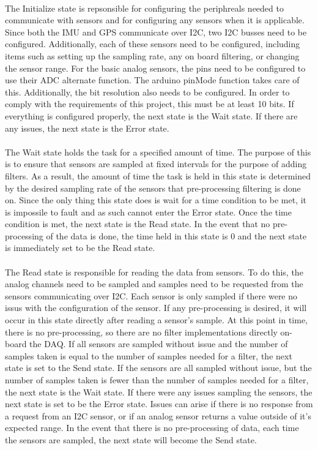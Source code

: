 \paragraph{}
The Initialize state is repsonsible for configuring the periphreals needed to communicate with sensors and for configuring any sensors when it is applicable.
Since both the IMU and GPS communicate over I2C, two I2C busses need to be configured.
Additionally, each of these sensors need to be configured, including items such as setting up the sampling rate, any on board filtering, or changing the sensor range.
For the basic analog sensors, the pins need to be configured to use their ADC alternate function.
The arduino pinMode function takes care of this.
Additionally, the bit resolution also needs to be configured.
In order to comply with the requirements of this project, this must be at least 10 bits.
If everything is configured properly, the next state is the Wait state.
If there are any issues, the next state is the Error state.

\paragraph{}
The Wait state holds the task for a specified amount of time.
The purpose of this is to ensure that sensors are sampled at fixed intervals for the purpose of adding filters.
As a result, the amount of time the task is held in this state is determined by the desired sampling rate of the sensors that pre-processing filtering is done on.
Since the only thing this state does is wait for a time condition to be met, it is impossile to fault and as such cannot enter the Error state.
Once the time condition is met, the next state is the Read state.
In the event that no pre-processing of the data is done, the time held in this state is 0 and the next state is immediately set to be the Read state.

\paragraph{}
The Read state is responsible for reading the data from sensors.
To do this, the analog channels need to be sampled and samples need to be requested from the sensors communicating over I2C.
Each sensor is only sampled if there were no issus with the configuration of the sensor.
If any pre-processing is desired, it will occur in this state directly after reading a sensor's sample.
At this point in time, there is no pre-processing, so there are no filter implementations directly on-board the DAQ.
If all sensors are sampled without issue and the number of samples taken is equal to the number of samples needed for a filter, the next state is set to the Send state.
If the sensors are all sampled without issue, but the number of samples taken is fewer than the number of samples needed for a filter, the next state is the Wait state.
If there were any issues sampling the sensors, the next state is set to be the Error state.
Issues can arise if there is no response from a request from an I2C sensor, or if an analog sensor returns a value outside of it's expected range.
In the event that there is no pre-processing of data, each time the sensors are sampled, the next state will become the Send state.

